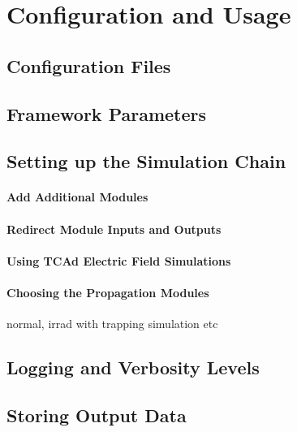 \section{Configuration and Usage}
\subsection{Configuration Files}
\label{sec:configuration_files}
\subsection{Framework Parameters}
\label{sec:framework_parameters}
\subsection{Setting up the Simulation Chain}
\paragraph{Add Additional Modules}
\paragraph{Redirect Module Inputs and Outputs}
\paragraph{Using TCAd Electric Field Simulations}
\paragraph{Choosing the Propagation Modules}
normal, irrad with trapping simulation etc
\subsection{Logging and Verbosity Levels}
\subsection{Storing Output Data}
